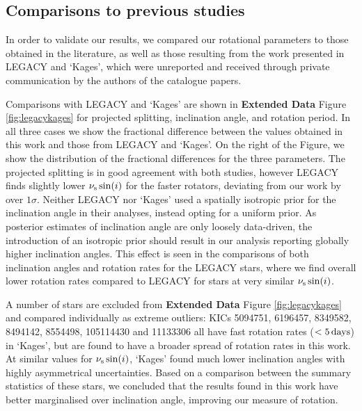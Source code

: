 \documentclass[12pt]{article}
\begin{document}
\subsection{Comparisons to previous studies}\label{ssec:litcomp}
In order to validate our results, we compared our rotational parameters to those obtained in the literature, as well as those resulting from the work presented in LEGACY and `Kages', which were unreported and received through private communication by the authors of the catalogue papers.

Comparisons with LEGACY and `Kages' are shown in \textbf{Extended Data} Figure \ref{fig:legacykages} for projected splitting, inclination angle, and rotation period. In all three cases we show the fractional difference between the values obtained in this work and those from LEGACY and `Kages'. On the right of the Figure, we show the distribution of the fractional differences for the three parameters.
The projected splitting is in good agreement with both studies, however LEGACY finds slightly lower $\nu_{\rm s}\sin(i)$ for the faster rotators, deviating from our work by over $1\sigma$. Neither LEGACY nor `Kages' used a spatially isotropic prior for the inclination angle in their analyses, instead opting for a uniform prior. As posterior estimates of inclination angle are only loosely data-driven, the introduction of an isotropic prior should result in our analysis reporting globally higher inclination angles. This effect is seen in the comparisons of both inclination angles and rotation rates for the LEGACY stars, where we find overall lower rotation rates compared to LEGACY for stars at very similar $\nu_{\rm s}\sin(i)$.

A number of stars are excluded from \textbf{Extended Data} Figure \ref{fig:legacykages} and compared individually as extreme outliers: KICs 5094751, 6196457, 8349582, 8494142, 8554498, 105114430 and 11133306 all have fast rotation rates ($<5\, \rm days$) in `Kages', but are found to have a broader spread of rotation rates in this work. At similar values for $\nu_{\rm s}\sin(i)$, `Kages' found much lower inclination angles with highly asymmetrical uncertainties. Based on a comparison between the summary statistics of these stars, we concluded that the results found in this work have better marginalised over inclination angle, improving our measure of rotation.
\end{document}
